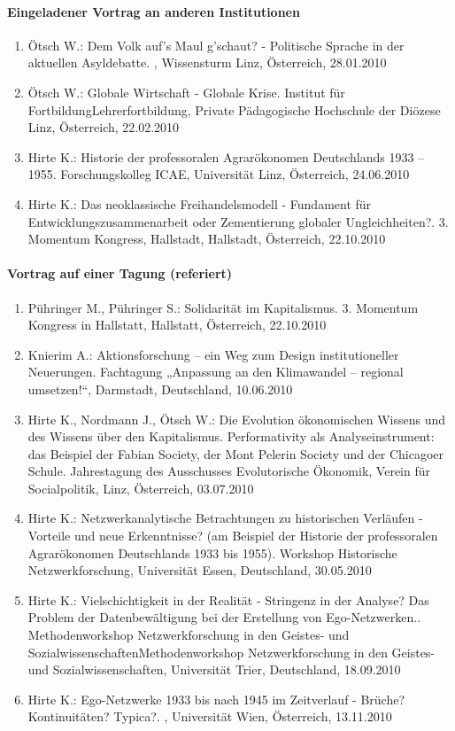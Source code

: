 \paragraph{Eingeladener Vortrag an anderen Institutionen}
\begin{enumerate}
	\item Ötsch W.: Dem Volk auf's Maul g'schaut? - Politische Sprache in der aktuellen Asyldebatte. , Wissensturm Linz, Österreich, 28.01.2010
	\item Ötsch W.: Globale Wirtschaft - Globale Krise. Institut für FortbildungLehrerfortbildung, Private Pädagogische Hochschule der Diözese Linz, Österreich, 22.02.2010
	\item Hirte K.: Historie der professoralen Agrarökonomen Deutschlands 1933 – 1955. Forschungskolleg ICAE, Universität Linz, Österreich, 24.06.2010
	\item Hirte K.: Das neoklassische Freihandelsmodell - Fundament für Entwicklungszusammenarbeit oder Zementierung globaler Ungleichheiten?. 3. Momentum Kongress, Hallstadt, Hallstadt, Österreich, 22.10.2010
\end{enumerate}
\paragraph{Vortrag auf einer Tagung (referiert)}
\begin{enumerate}
	\item Pühringer M., Pühringer S.: Solidarität im Kapitalismus. 3. Momentum Kongress in Hallstatt, Hallstatt, Österreich, 22.10.2010
	\item Knierim A.: Aktionsforschung – ein Weg zum Design institutioneller Neuerungen. Fachtagung „Anpassung an den Klimawandel – regional umsetzen!“, Darmstadt, Deutschland, 10.06.2010
	\item Hirte K., Nordmann J., Ötsch W.: Die Evolution ökonomischen Wissens und des Wissens über den Kapitalismus. Performativity als Analyseinstrument: das Beispiel der Fabian Society, der Mont Pelerin Society und der Chicagoer Schule. Jahrestagung des Ausschusses Evolutorische Ökonomik, Verein für Socialpolitik, Linz, Österreich, 03.07.2010
	\item Hirte K.: Netzwerkanalytische Betrachtungen zu historischen Verläufen - Vorteile und neue Erkenntnisse? (am Beispiel der Historie der professoralen Agrarökonomen Deutschlands 1933 bis 1955). Workshop Historische Netzwerkforschung, Universität Essen, Deutschland, 30.05.2010
	\item Hirte K.: Vielschichtigkeit in der Realität - Stringenz in der Analyse? Das Problem der Datenbewältigung bei der Erstellung von Ego-Netzwerken.. Methodenworkshop Netzwerkforschung in den Geistes- und SozialwissenschaftenMethodenworkshop Netzwerkforschung in den Geistes- und Sozialwissenschaften, Universität Trier, Deutschland, 18.09.2010
	\item Hirte K.: Ego-Netzwerke 1933 bis nach 1945 im Zeitverlauf - Brüche? Kontinuitäten? Typica?. , Universität Wien, Österreich, 13.11.2010
\end{enumerate}
